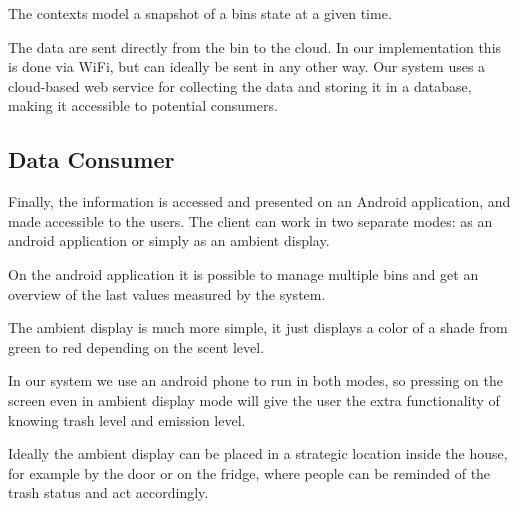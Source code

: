 The contexts model a snapshot of a bins state at a given time.

The data are sent directly from the bin to the cloud. In our implementation this is done via WiFi, but can ideally be sent in any other way.
Our system uses a cloud-based web service for collecting the data and storing it in a database, making it accessible to potential consumers.

\subsection{Data Consumer}
Finally, the information is accessed and presented on an Android application, and made accessible to the users. 
The client can work in two separate modes: as an android application or simply as an ambient display.

On the android application it is possible to manage multiple bins and get an overview of the last values measured by the system.

The ambient display is much more simple, it just displays a color of a shade from green to red depending on the scent level. 

In our system we use an android phone to run in both modes, so pressing on the screen even in ambient display mode will give the user the extra functionality of knowing trash level and emission level.

Ideally the ambient display can be placed in a strategic location inside the house, for example by the door or on the fridge, where people can be reminded of the trash status and act accordingly.